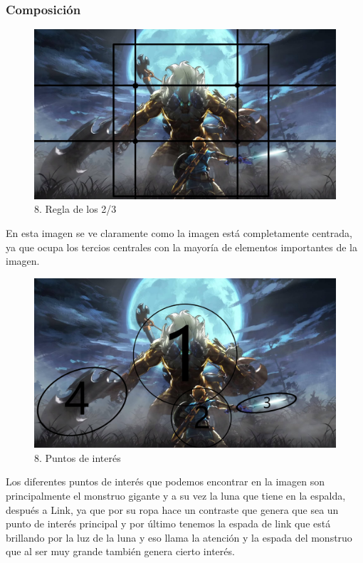 \documentclass[12pt]{article}
\begin{document}
        \subsubsection{Composición}

\begin{figure}[H]
      \centering
      \includegraphics[scale=0.25]{images/Raúl/Sección 8/Imagen 8 2 3.jpg}
      \caption{\small 8. Regla de los 2/3}
    \end{figure}

En esta imagen se ve claramente como la imagen está completamente centrada, ya que ocupa los tercios centrales con la mayoría de elementos importantes de la imagen.

\begin{figure}[H]
      \centering
      \includegraphics[scale=0.25]{images/Raúl/Sección 8/Imagen 8 p. interes.jpg}
      \caption{\small 8. Puntos de interés}
    \end{figure}

Los diferentes puntos de interés que podemos encontrar en la imagen son principalmente el monstruo gigante y a su vez la luna que tiene en la espalda, después a Link, ya que por su ropa hace un contraste que genera que sea un punto de interés principal y por último tenemos la espada de link que está brillando por la luz de la luna y eso llama la atención y la espada del monstruo que al ser muy grande también genera cierto interés.
\end{document}
